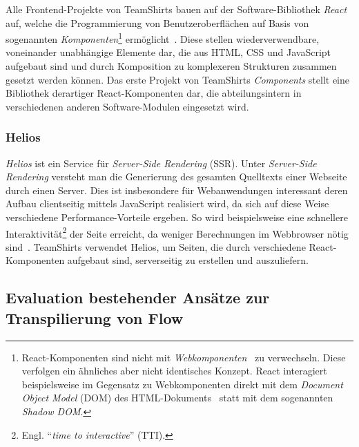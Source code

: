 Alle Frontend-Projekte von TeamShirts bauen auf der Software-Bibliothek \textit{React}~\autocite{SOFTWARE:REACT} auf, welche die Programmierung von Benutzeroberflächen auf Basis von sogenannten \emph{Komponenten}\footnote{React-Komponenten sind nicht mit \textit{Webkomponenten}~\autocite{MDN:WEBCOMPONENTS} zu verwechseln. Diese verfolgen ein ähnliches aber nicht identisches Konzept. React interagiert beispielsweise im Gegensatz zu Webkomponenten direkt mit dem \textit{Document Object Model} (DOM) des HTML-Dokuments~\autocite{REACT:WEBCOMPONENTS} statt mit dem sogenannten \textit{Shadow DOM}.} ermöglicht~\autocite{ACM:REACT}. Diese stellen wiederverwendbare, voneinander unabhängige Elemente dar, die aus HTML, CSS und JavaScript aufgebaut sind und durch Komposition zu komplexeren Strukturen zusammen gesetzt werden können. Das erste Projekt von TeamShirts \textit{Components} stellt eine Bibliothek derartiger React-Komponenten dar, die abteilungsintern in verschiedenen anderen Software-Modulen eingesetzt wird.

\subsubsection{Helios}

\textit{Helios} ist ein Service für \emph{Server-Side Rendering} (SSR). Unter \emph{Server-Side Rendering} versteht man die Generierung des gesamten Quelltexts einer Webseite durch einen Server. Dies ist insbesondere für Webanwendungen interessant deren Aufbau clientseitig mittels JavaScript realisiert wird, da sich auf diese Weise verschiedene Performance-Vorteile ergeben. So wird beispielsweise eine schnellere Interaktivität\footnote{Engl. \enquote{\textit{time to interactive}} (TTI).} der Seite erreicht, da weniger Berechnungen im Webbrowser nötig sind~\autocite{GOOGLE:RENDERING_ON_THE_WEB}. TeamShirts verwendet Helios, um Seiten, die durch verschiedene React-Komponenten aufgebaut sind, serverseitig zu erstellen und auszuliefern.

\subsection{Evaluation bestehender Ansätze zur Transpilierung von Flow}
\label{sec:evaluation-other-transpilers}

